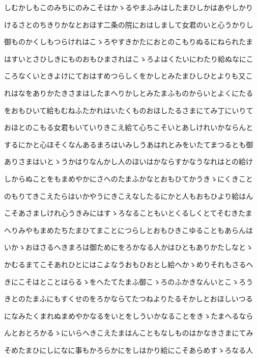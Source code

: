 \documentclass[a4paper,11pt,landscape]{ltjtarticle}
\begin{document}
\par\medskip
しむかしもこのみちにのみこそはかゝるやまふみはしたまひしかはあやしかり
\par\medskip
けるさとのちきりかなとおほす二条の院におはしまして女君のいと心うかりし
\par\medskip
御ものかくしもつらけれはこゝろやすきかたにおとのこもりぬるにねられたま
\par\medskip
はすいとさひしきにものおもひまされはこゝろよはくたいにわたり給ぬなにこ
\par\medskip
ころなくいときよけにておはすめつらしくをかしとみたまひしひとよりも又こ
\par\medskip
れはなをありかたきさまはしたまへりかしとみたまふものからいとよくにたる
\par\medskip
をおもひいて給もむねふたかれはいたくものおほしたるさまにてみ丁にいりて
\par\medskip
おほとのこもる女君もいていりきこえ給て心ちこそいとあしけれいかならんと
\par\medskip
するにかと心ほそくなんあるまろはいみしうあはれとみをいたてまつるとも御
\par\medskip
ありさまはいとゝうかはりなんかし人のほいはかならすかなうなれはとの給け
\par\medskip
しからぬことをもまめやかにさへのたまふかなとおもひてかうきゝにくきこと
\par\medskip
のもりてきこえたらはいかやうにきこえなしたるにかと人もおもひより給はん
\par\medskip
こそあさましけれ心うきみにはすゝろなることもいとくるしくとてそむきたま
\par\medskip
へりみやもまめたちたまひてまことにつらしとおもひきこゆることもあらんは
\par\medskip
いかゝおほさるへきまろは御ためにをろかなる人かはひともありかたしなとゝ
\par\medskip
かむるまてこそあれひとにはこよなうおもひおとし給へかゝめりそれもさるへ
\par\medskip
きにこそはとことはらるゝをへたてたまふ御こゝろのふかきなんいとこゝろう
\par\medskip
きとのたまふにもすくせのをろかならてたつねよりたるそかしとおほしいつる
\par\medskip
になみたくまれぬまめやかなるをいとをしういかなることをきゝたまへるなら
\par\medskip
んとおとろかるゝにいらへきこえたまはんこともなしものはかなきさまにてみ
\par\medskip
そめたまひにしになに事もかろらかにをしはかり給にこそあらめすゝろなる人
\end{document}
